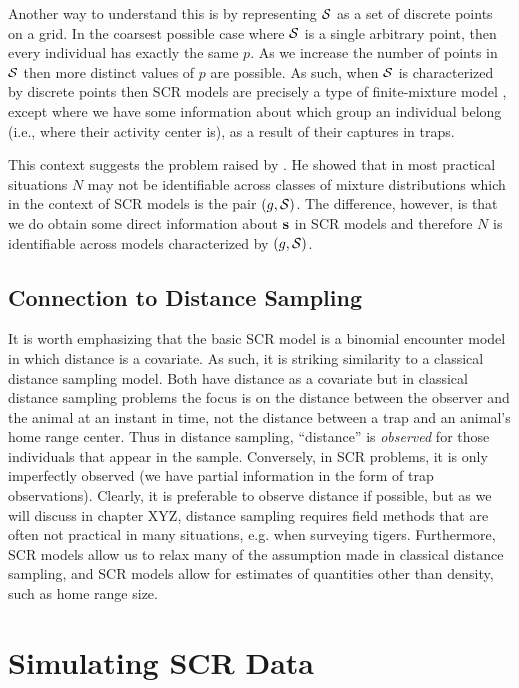 Another way to understand this is by representing ${\cal S}$ as a set
of discrete points on a grid. In the coarsest possible case where
${\cal S}$ is a single arbitrary point, then every individual has
exactly the same $p$. As we increase the number of points in ${\cal
  S}$ then more distinct values of $p$ are possible. As such, when
${\cal S}$ is characterized by discrete points then SCR models are
precisely a type of finite-mixture model \citep{norris_pollock:1996,
  pledger:2000}, except where we have some information about which
group an individual belong (i.e., where their activity center is), as
a result of their captures in traps.

This context suggests the problem raised by \citet{link:2003}. He
showed that in most practical situations $N$ may not be identifiable
across classes of mixture distributions which in the context of SCR
models is the pair $(g, {\cal S})$.  The difference, however, is that
we do obtain some direct information about ${\bf s}$ in SCR models and
therefore $N$ is identifiable across models characterized by $(g,{\cal
  S})$.

\subsection{Connection to Distance Sampling}

It is worth emphasizing that the basic SCR model is a binomial
encounter model in which distance is a covariate. As such, it is
striking similarity to a classical distance sampling model. Both have
distance as a covariate but in classical distance sampling problems
the focus is on the distance between the observer and the animal at an
instant in time, not the distance between a trap and an animal's home
range center. Thus in distance sampling, ``distance'' is {\it
  observed} for those individuals that appear in the
sample. Conversely, in SCR problems, it is only imperfectly observed
(we have partial information in the form of trap observations).
Clearly, it is preferable to observe distance if possible, but as we
will discuss in chapter XYZ, distance sampling requires field methods that
are often not practical in many situations, e.g. when surveying
tigers. Furthermore, SCR models allow us to relax many of the
assumption made in classical distance sampling, and SCR models allow
for estimates of quantities other than density, such as home range
size.


\section{Simulating SCR Data}

